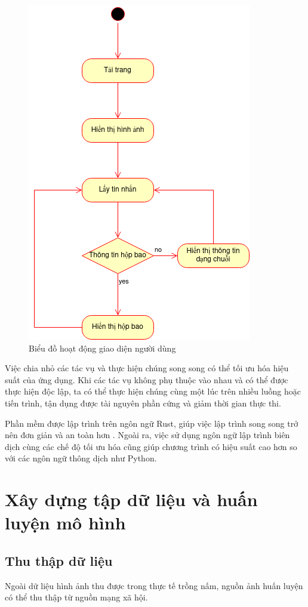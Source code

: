\begin{figure}[H]
    \centering
    \includegraphics[width=0.55\linewidth]{images/ui-activity.png}
    \caption{Biểu đồ hoạt động giao diện người dùng}
    \label{fig:ui-activity}
\end{figure}

Việc chia nhỏ các tác vụ và thực hiện chúng song song có thể tối ưu hóa hiệu suất của ứng dụng. Khi các tác vụ không phụ thuộc vào nhau và có thể được thực hiện độc lập, ta có thể thực hiện chúng cùng một lúc trên nhiều luồng hoặc tiến trình, tận dụng được tài nguyên phần cứng và giảm thời gian thực thi.

Phần mềm được lập trình trên ngôn ngữ Rust, giúp việc lập trình song song trở nên đơn giản và an toàn hơn \cite{rust2022}. Ngoài ra, việc sử dụng ngôn ngữ lập trình biên dịch cùng các chế độ tối ưu hóa cũng giúp chương trình có hiệu suất cao hơn so với các ngôn ngữ thông dịch như Python.

\section{Xây dựng tập dữ liệu và huấn luyện mô hình}

\subsection{Thu thập dữ liệu}

Ngoài dữ liệu hình ảnh thu được trong thực tế trồng nấm, nguồn ảnh huấn luyện có thể thu thập từ nguồn mạng xã hội.

